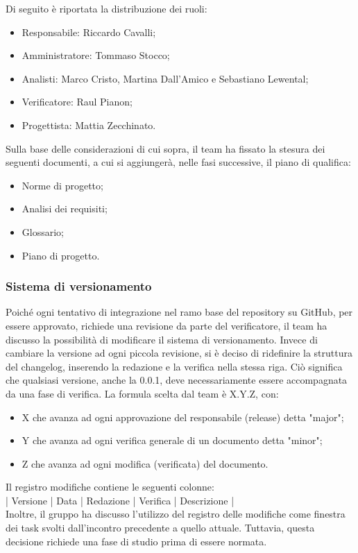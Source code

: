 \vspace{0.5\baselineskip}
Di seguito è riportata la distribuzione dei ruoli:
\begin{itemize}
	\item Responsabile: Riccardo Cavalli;
	\item Amministratore: Tommaso Stocco;
	\item Analisti: Marco Cristo, Martina Dall'Amico e Sebastiano Lewental;
	\item Verificatore: Raul Pianon;
	\item Progettista: Mattia Zecchinato.
\end{itemize}

\vspace{0.5\baselineskip}
Sulla base delle considerazioni di cui sopra, il team ha fissato la stesura dei seguenti documenti, a cui si aggiungerà, nelle fasi successive, il piano di qualifica:
\begin{itemize}
	\item Norme di progetto;
	\item Analisi dei requisiti;
	\item Glossario;
	\item Piano di progetto.
\end{itemize}

\subsubsection{Sistema di versionamento}
Poiché ogni tentativo di integrazione nel ramo base del repository su GitHub, per essere approvato, richiede una revisione da parte del verificatore, il team ha discusso la possibilità di modificare il sistema di versionamento. Invece di cambiare la versione ad ogni piccola revisione, si è deciso di ridefinire la struttura del changelog,  inserendo la redazione e la verifica nella stessa riga. Ciò significa che qualsiasi versione, anche la 0.0.1, deve necessariamente essere accompagnata da una fase di verifica. La formula scelta dal team è X.Y.Z, con:
\begin{itemize}
	\item X che avanza ad ogni approvazione del responsabile (release) detta "major";
	\item Y che avanza ad ogni verifica generale di un documento detta "minor";
	\item Z che avanza ad ogni modifica (verificata) del documento.
\end{itemize}

\vspace{0.5\baselineskip}
Il registro modifiche contiene le seguenti colonne: \\
\vspace{\baselineskip}
\hspace{1.2cm} | Versione | Data | Redazione | Verifica | Descrizione | \\
Inoltre, il gruppo ha discusso l'utilizzo del registro delle modifiche come finestra dei task svolti dall'incontro precedente a quello attuale. Tuttavia, questa decisione richiede una fase di studio prima di essere normata.

